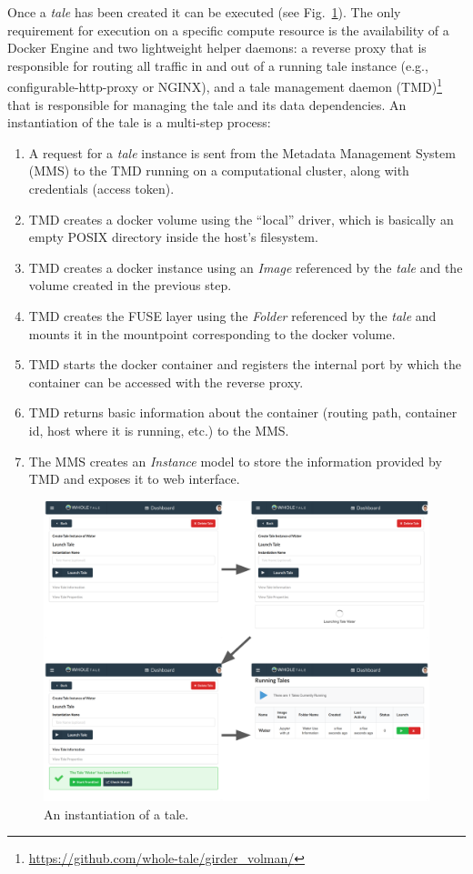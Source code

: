 \documentclass[review]{elsarticle}
\begin{document}
Once a \emph{tale} has been created it can be executed (see Fig.~\ref{fig:instance}). The only requirement for execution on a specific compute resource is the availability of a Docker Engine
and two lightweight helper daemons: a reverse proxy that is responsible for routing all traffic in and out of a running tale instance (e.g., configurable-http-proxy or NGINX), and a tale management daemon (TMD)\footnote{\url{https://github.com/whole-tale/girder_volman/}} that is responsible for managing
the tale and its data dependencies. An instantiation of the tale is a multi-step process:
\begin{enumerate}
	\item A request for a \emph{tale} instance is sent from the Metadata Management System (MMS) to the TMD running on a computational cluster, along with credentials (access token).
    \item TMD creates a docker volume using the ``local'' driver, which is basically an empty POSIX directory inside the host's filesystem.
    \item TMD creates a docker instance using an \emph{Image} referenced by the \emph{tale} and the volume created in the previous step.
    \item TMD creates the FUSE layer using the \emph{Folder} referenced by the \emph{tale} and mounts it in the mountpoint corresponding to the docker volume.
    \item TMD starts the docker container and registers the internal port by which the container can be accessed with the reverse proxy.
    \item TMD returns basic information about the container (routing path, container id, host where it is running, etc.) to the MMS.
    \item The MMS creates an \emph{Instance} model to store the information provided by TMD and exposes it to web interface.
\end{enumerate}

\begin{figure}[ht!]
\centering
  \includegraphics[trim=0in 3in 0in 0in,clip,width=0.75\columnwidth]{instance.png}
\caption{An instantiation of a tale. \label{fig:instance}}
\end{figure}
\end{document}
